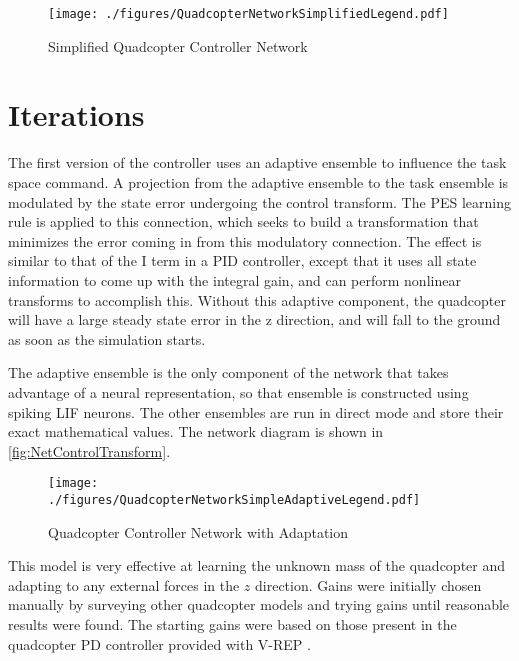 \documentclass[letterpaper,12pt,titlepage,oneside,final]{book}
\begin{document}
\begin{figure}
\centering
\texttt{[image: ./figures/QuadcopterNetworkSimplifiedLegend.pdf]} %
\caption{Simplified Quadcopter Controller Network}
\label{fig:NetSimplified}
\end{figure}

\section{Iterations}


The first version of the controller uses an adaptive ensemble to influence the task space command. 
A projection from the adaptive ensemble to the task ensemble is modulated by the state error undergoing the control transform. 
The PES learning rule is applied to this connection, which seeks to build a transformation that minimizes the error coming in from this modulatory connection. 
The effect is similar to that of the I term in a PID controller, except that it uses all state information to come up with the integral gain, and can perform nonlinear transforms to accomplish this. Without this adaptive component, the quadcopter will have a large steady state error in the z direction, and will fall to the ground as soon as the simulation starts.

The adaptive ensemble is the only component of the network that takes advantage of a neural representation, so that ensemble is constructed using spiking LIF neurons. The other ensembles are run in direct mode and store their exact mathematical values.
The network diagram is shown in \autoref{fig:NetControlTransform}.

\begin{figure}
\centering
\texttt{[image: ./figures/QuadcopterNetworkSimpleAdaptiveLegend.pdf]} %
\caption{Quadcopter Controller Network with Adaptation}
\label{fig:NetControlTransform}

\end{figure}

This model is very effective at learning the unknown mass of the quadcopter and adapting to any external forces in the $z$ direction. 
Gains were initially chosen manually by surveying other quadcopter models and trying gains until reasonable results were found. %
The starting gains were based on those present in the quadcopter PD controller provided with V-REP \cite{vrep}.
\end{document}
